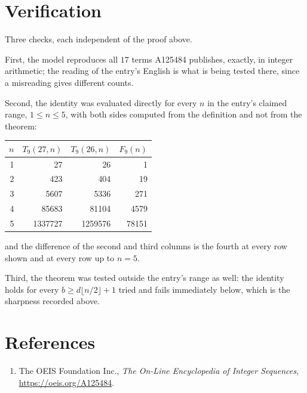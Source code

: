 \documentclass[11pt,a4paper]{article}
\theoremstyle{plain}
\theoremstyle{definition}
\begin{document}
\section{Verification}

Three checks, each independent of the proof above.

First, the model reproduces all $17$ terms A125484 publishes, exactly, in integer
arithmetic; the reading of the entry's English is what is being tested there, since a
misreading gives different counts.

Second, the identity was evaluated directly for every $n$ in the entry's claimed range,
$1\le n\le5$, with both sides computed from the definition and not from the theorem:

\begin{center}
\begin{tabular}{rrrr}
$n$ & $T_{9}(27,n)$ & $T_{9}(26,n)$ & $F_{9}(n)$ \\ \hline
1 & 27 & 26 & 1 \\
2 & 423 & 404 & 19 \\
3 & 5607 & 5336 & 271 \\
4 & 85683 & 81104 & 4579 \\
5 & 1337727 & 1259576 & 78151 \\
\end{tabular}
\end{center}

\noindent and the difference of the second and third columns is the fourth at every row shown
and at every row up to $n=5$.

Third, the theorem was tested outside the entry's range as well: the identity holds for every
$b\ge d\lfloor n/2\rfloor+1$ tried and fails immediately below, which is the sharpness recorded
above.

\section*{References}
\begin{enumerate}
\item The OEIS Foundation Inc., \emph{The On-Line Encyclopedia of Integer Sequences},
\url{https://oeis.org/A125484}.
\end{enumerate}
\end{document}
